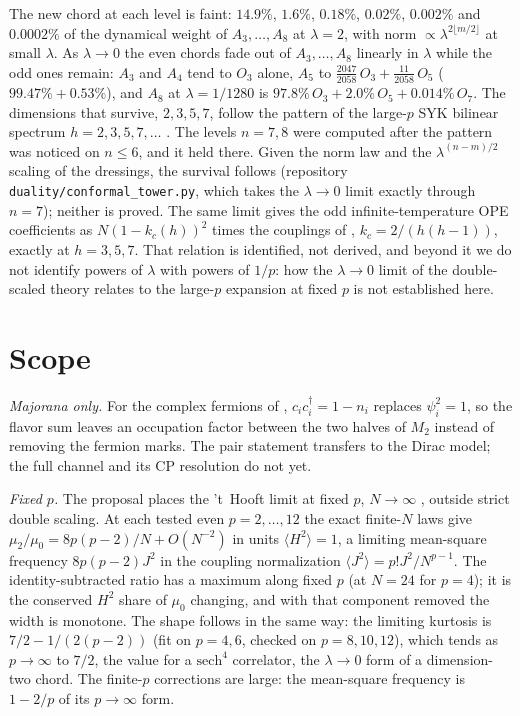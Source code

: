 \documentclass[11pt]{article}
\begin{document}
The new chord at each level is faint: $14.9\%$, $1.6\%$, $0.18\%$,
$0.02\%$, $0.002\%$ and $0.0002\%$ of the dynamical weight of
$A_3,\dots,A_8$ at $\lambda=2$, with norm
$\propto\lambda^{2\lfloor m/2\rfloor}$ at small $\lambda$. As
$\lambda\to0$ the even chords fade out of $A_3,\dots,A_8$ linearly in
$\lambda$ while the odd ones remain: $A_3$ and $A_4$ tend to $O_3$ alone,
$A_5$ to $\tfrac{2047}{2058}\,O_3+\tfrac{11}{2058}\,O_5$
($99.47\%+0.53\%$), and $A_8$ at $\lambda=1/1280$ is
$97.8\%\,O_3+2.0\%\,O_5+0.014\%\,O_7$. The dimensions that survive,
$2,3,5,7$, follow the pattern of the large-$p$ SYK bilinear spectrum
$h=2,3,5,7,\dots$ \cite{MS}. The levels $n=7,8$ were computed after the
pattern was noticed on $n\le6$, and it held there. Given the norm law
and the $\lambda^{(n-m)/2}$ scaling of the dressings, the survival
follows (repository \texttt{duality/conformal\_tower.py}, which takes the
$\lambda\to0$ limit exactly through $n=7$); neither is proved. The same
limit gives the odd infinite-temperature OPE coefficients as
$N(1-k_c(h))^2$ times the couplings of \cite{GR}, $k_c=2/(h(h-1))$,
exactly at $h=3,5,7$. That relation is identified, not derived, and
beyond it we do not identify powers of $\lambda$ with powers of $1/p$:
how the $\lambda\to0$ limit of the double-scaled theory relates to the
large-$p$ expansion at fixed $p$ is not established here.

\section{Scope}

\emph{Majorana only.} For the complex fermions of \cite{MSS2607},
$c_ic_i^\dagger=1-n_i$ replaces $\psi_i^2=1$, so the flavor sum leaves
an occupation factor between the two halves of $M_2$ instead of removing
the fermion marks. The pair statement transfers to the Dirac model; the
full channel and its CP resolution do not yet.

\emph{Fixed $p$.} The proposal places the 't~Hooft limit at fixed $p$,
$N\to\infty$ \cite{MSS2607,MSS2506}, outside strict double scaling. At
each tested even $p=2,\dots,12$ the exact finite-$N$ laws give $\mu_2/\mu_0=8p(p-2)/N+O(N^{-2})$ in units
$\langle H^2\rangle=1$, a limiting mean-square frequency $8p(p-2)J^2$ in
the coupling normalization $\langle J^2\rangle=p!J^2/N^{p-1}$. The
identity-subtracted ratio has a maximum along fixed $p$ (at $N=24$ for
$p=4$); it is the conserved $H^2$ share of $\mu_0$ changing, and with
that component removed the width is monotone. The shape follows in the
same way: the limiting kurtosis is $7/2-1/(2(p-2))$ (fit on $p=4,6$,
checked on $p=8,10,12$), which tends as $p\to\infty$ to $7/2$, the value
for a $\mathrm{sech}^4$ correlator, the $\lambda\to0$ form of a
dimension-two chord. The finite-$p$ corrections are large: the
mean-square frequency is $1-2/p$ of its $p\to\infty$ form.
\end{document}
